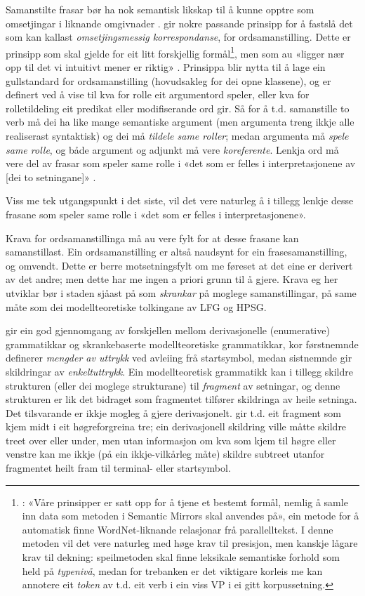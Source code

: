 \documentclass[11pt,a4paper,oneside,draft]{book}
\begin{document}
Samanstilte frasar bør ha nok semantisk likskap til å kunne opptre som
omsetjingar i liknande omgivnader
\citep[s.~74]{dyvik2009lmp}. \citet{thunes2003eal} gir nokre passande prinsipp
for å fastslå det som kan kallast \emph{omsetjingsmessig korrespondanse}, for
ordsamanstilling. Dette er prinsipp som skal gjelde for eit litt forskjellig
formål\footnote{\cite[s.~2]{thunes2003eal}: «Våre prinsipper er satt
opp for å tjene et bestemt formål, nemlig å samle inn data som metoden
i Semantic Mirrors skal anvendes på», ein metode for å automatisk
finne WordNet-liknande relasjonar frå parallelltekst. I denne metoden
vil det vere naturleg med høge krav til presisjon, men kanskje lågare
krav til dekning: speilmetoden skal finne leksikale semantiske forhold
som held på \emph{typenivå}, medan for trebanken er det viktigare korleis
me kan annotere eit \emph{token} av t.d. eit verb i ein viss VP i ei gitt
korpussetning. }, men som au «ligger nær opp til det vi intuitivt
mener er riktig» \citep[s.~2]{thunes2003eal}. Prinsippa blir nytta til
å lage ein gullstandard for ordsamanstilling (hovudsakleg for dei opne
klassene), og er definert ved å vise til kva for rolle eit argumentord
speler, eller kva for rolletildeling eit predikat eller modifiserande
ord gir. Så for å t.d. samanstille to verb må dei ha like mange
semantiske argument (men argumenta treng ikkje alle realiserast
syntaktisk) og dei må \emph{tildele same roller}; medan argumenta må \emph{spele same rolle}, og både argument og adjunkt må vere \emph{koreferente}. Lenkja
ord må vere del av frasar som speler same rolle i «det som er felles i
interpretasjonene av [dei to setningane]» \citep[s.~3]{thunes2003eal}.

Viss me tek utgangspunkt i det siste, vil det vere naturleg å i
tillegg lenkje desse frasane som speler same rolle i «det som er
felles i interpretasjonene».

Krava for ordsamanstillinga må au vere fylt for at desse frasane kan
samanstillast. Ein ordsamanstilling er altså naudsynt for ein
frasesamanstilling, og omvendt. Dette er berre motsetningsfylt om me
føreset at det eine er derivert av det andre; men dette har me ingen a
priori grunn til å gjere. Krava eg her utviklar bør i staden sjåast på
som \emph{skrankar} på moglege samanstillingar, på same måte som dei
modellteoretiske tolkingane av LFG og HPSG.

\citet{pullum2001dbm} gir ein god gjennomgang av forskjellen
mellom derivasjonelle (enumerative) grammatikkar og skrankebaserte
modellteoretiske grammatikkar, kor førstnemnde definerer \emph{mengder av uttrykk} ved avleiing frå startsymbol, medan sistnemnde gir skildringar
av \emph{enkeltuttrykk}. Ein modellteoretisk grammatikk kan i tillegg skildre
strukturen (eller dei moglege strukturane) til \emph{fragment} av setningar,
og denne strukturen er lik det bidraget som fragmentet tilfører
skildringa av heile setninga. Det tilsvarande er ikkje mogleg å gjere
derivasjonelt. \citet[s.~32--33]{pullum2001dbm} gir t.d. eit fragment
som kjem midt i eit høgreforgreina tre; ein derivasjonell skildring
ville måtte skildre treet over eller under, men utan informasjon om
kva som kjem til høgre eller venstre kan me ikkje (på ein
ikkje-vilkårleg måte) skildre subtreet utanfor fragmentet heilt fram
til terminal- eller startsymbol. 
\end{document}
